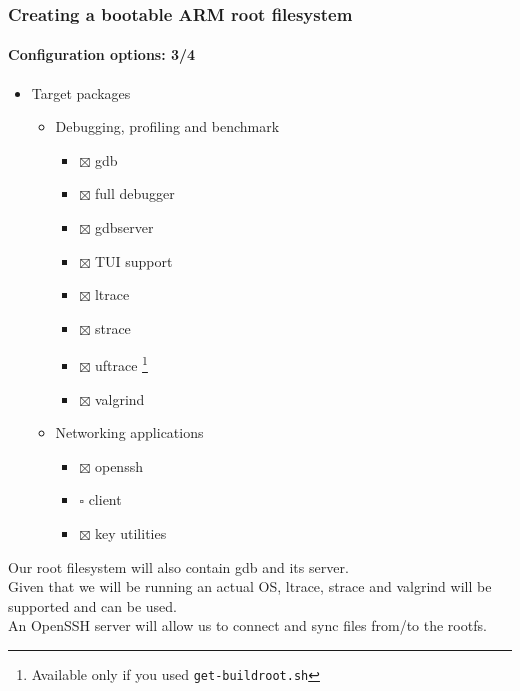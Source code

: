 {  \begin{frame}
    \frametitle{Creating a bootable ARM root filesystem}
    \framesubtitle{Configuration options: 3/4}
    \begin{itemize}
      \item Target packages
      \begin{itemize}
        \item Debugging, profiling and benchmark
        \begin{itemize}
          \item $\boxtimes$ gdb
          \item $\boxtimes$ full debugger
          \item $\boxtimes$ gdbserver
          \item $\boxtimes$ TUI support
          \item $\boxtimes$ ltrace
          \item $\boxtimes$ strace
          \item $\boxtimes$ uftrace \footnote{Available only if you used \texttt{get-buildroot.sh}}
          \item $\boxtimes$ valgrind
        \end{itemize}
        \item Networking applications
        \begin{itemize}
          \item $\boxtimes$ openssh
          \item $\square$ client
          \item $\boxtimes$ key utilities
        \end{itemize}
      \end{itemize}
    \end{itemize}
  \end{frame}
   {
    Our root filesystem will also contain gdb and its server. \\
    Given that we will be running an actual OS, ltrace, strace and valgrind will be supported and can be used. \\
    An OpenSSH server will allow us to connect and sync files from/to the rootfs.
  }

}

